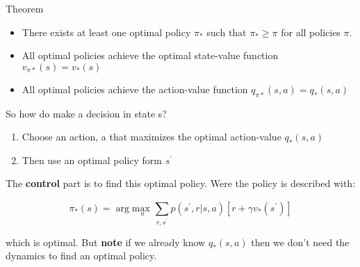 \begin{wbox}{Theorem}
\begin{itemize}
	\item There exists at least one optimal policy $\pi_*$ such that $\pi_* \ge \pi$ for all policies $\pi$.
	\item All optimal policies achieve the optimal state-value function $v_{\pi *}(s) = v_*(s)$ 
	\item All optimal policies achieve the action-value function $q_{\pi *} (s,a) = q_* (s,a)$
\end{itemize}
\end{wbox}


So how do make a decision in state s?

\begin{enumerate}
	\item Choose an action, a that maximizes the optimal action-value $q_*(s,a)$
	\item Then use an optimal policy form $s^{\prime}$
\end{enumerate}

The \textbf{control} part is to find this optimal policy. Were the policy is described with:

	\begin{equation}
		\pi_* (s) = \arg \underset{a}{\text{max }} \sum_{r, s^{\prime}}^{} p(s^{\prime},r |s,a) [r + \gamma v_*(s^{\prime})] 
	\end{equation}

which is optimal. But \textbf{note} if we already know $q_*(s,a)$ then we don't need the dynamics to find an optimal policy. 





